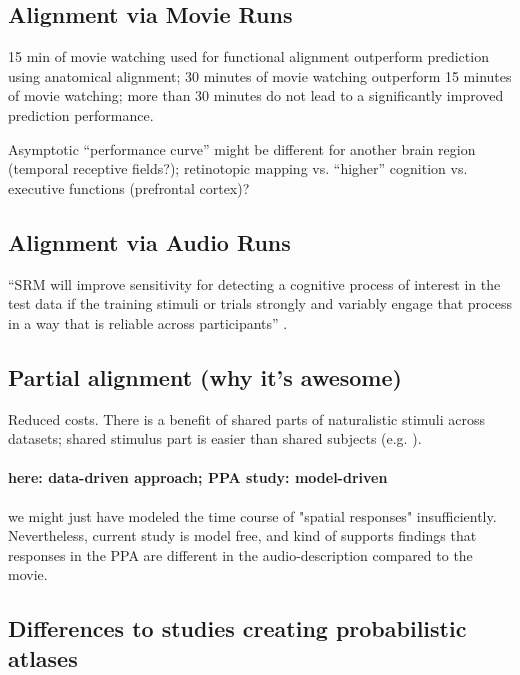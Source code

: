 \subsection{Alignment via Movie Runs}

%
15 min of movie watching used for functional alignment outperform prediction
using anatomical alignment;
%
30 minutes of movie watching outperform 15 minutes of movie watching;
%
more than 30 minutes do not lead to a significantly improved prediction
performance.

%
Asymptotic ``performance curve'' might be different for another brain region
(temporal receptive fields?); retinotopic mapping vs. ``higher'' cognition  vs.
executive functions (prefrontal cortex)?


\subsection{Alignment via Audio Runs}

``SRM will improve sensitivity for detecting a cognitive process of interest in
the test data if the training stimuli or trials strongly and variably engage
that process in a way that is reliable across participants''
\citep{cohen2017computational}.


\subsection{Partial alignment (why it's awesome)}

%
Reduced costs.
%
There is a benefit of shared parts of naturalistic stimuli across datasets;
shared stimulus part is easier than shared subjects (e.g.
\citep{zhang2018transfer}).


\paragraph{here: data-driven approach; PPA study: model-driven}
%
we might just have modeled the time course of "spatial responses"
insufficiently.
%
Nevertheless, current study is model free, and kind of supports findings that
responses in the PPA are different in the audio-description compared to the
movie.



\subsection{Differences to studies creating probabilistic atlases}

